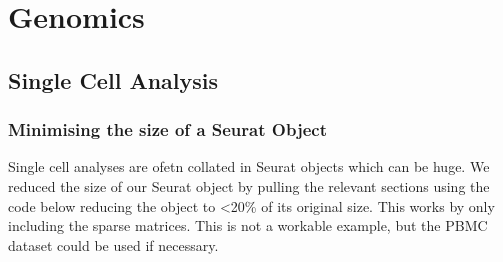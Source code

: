 \documentclass[
]{book}
\begin{document}
\hypertarget{genomics}{%
\chapter{Genomics}\label{genomics}}

\hypertarget{single-cell-analysis}{%
\section{Single Cell Analysis}\label{single-cell-analysis}}

\hypertarget{minimising-the-size-of-a-seurat-object}{%
\subsection{Minimising the size of a Seurat Object}\label{minimising-the-size-of-a-seurat-object}}

Single cell analyses are ofetn collated in Seurat objects which can be huge. We reduced the size of our Seurat object by pulling the relevant sections using the code below reducing the object to \textless20\% of its original size. This works by only including the sparse matrices. This is not a workable example, but the PBMC dataset could be used if necessary.
\end{document}
